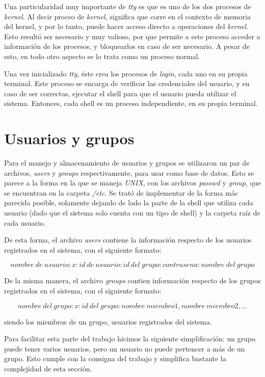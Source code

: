 \documentclass[a4paper,10pt]{article}
\begin{document}
Una particularidad muy importante de \textit{tty} es que es uno de los dos procesos de \textit{kernel}.
Al decir proceo de \textit{kernel}, significa que corre en el contexto de memoria del kernel, y por lo tanto, puede hacer acceso directo a operaciones del \textit{kernel}.
Esto resultó ser necesario y muy valioso, por que permite a este proceso acceder a información de los procesos, y bloquearlos en caso de ser necesario.
A pesar de esto, en todo otro aspecto se lo trata como un proceso normal.

Una vez inicializado \textit{tty}, éste crea los procesos de \textit{login}, cada uno en su propia terminal.
Este proceso se encarga de verificar las credenciales del usuario, y en caso de ser correctas, ejecutar el shell para que el usuario pueda utilizar el sistema.
Entonces, cada shell es un proceso independiente, en su propia terminal.

\newpage
\section{Usuarios y grupos}
Para el manejo y almacenamiento de usuarios y grupos se utilizaron un par de archivos, \textit{users} y \textit{groups} respectivamente, para usar como 
base de datos. Esto se parece a la forma en la que se maneja \textit{UNIX}, con los archivos \textit{passwd} y \textit{group}, que se encuentran en la carpeta
\textit{/etc}. Se trató de implementar de la forma más parecida posible, solamente dejando de lado la parte de la shell que utiliza cada usuario (dado que el sistema
solo cuenta con un tipo de shell) y la carpeta raíz de cada usuario.

De esta forma, el archivo \textit{users} contiene la información respecto de los usuarios registrados en el sistema, con el siguiente formato:

\[nombre\ de\ usuario:x: id\ de\ usuario: id\ del\ grupo: contrasena: nombre\ del\ grupo\]

De la misma manera, el archivo \textit{groups} contien información respecto de los grupos registrados en el sistema, con el siguiente formato:

\[nombre\ del\ grupo:x: id\ del\ grupo:nombre\ miembro1, nombre\ miembro2, ...\]

siendo los miembros de un grupo, usuarios registrados del sistema.

Para facilitar esta parte del trabajo hicimos la siguiente simplificación: un grupo puede tener varios usuarios, pero un usuario no puede pertencer a más de 
un grupo. Esto cumple con la consigna del trabajo y simplifica bastante la complejidad de esta sección.
\end{document}

